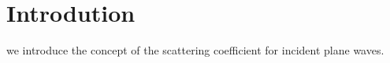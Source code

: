 \documentclass[12pt]{iopart}
\begin{document}
\newcommand{\mL}{\mathscr{L}}
\newcommand{\cT}{{\cal T}}
\newcommand{\cM}{{\cal M}}
\newcommand{\cE}{{\cal E}}
\newcommand{\cL}{{\cal L}}
\newcommand{\cF}{{\cal F}}
\newcommand{\cB}{{\cal B}}
\newcommand{\PML}{{\rm PML}}
\newcommand{\FEM}{{\rm FEM}}
\newcommand{\rd}{\,\mathrm{d}}

\renewcommand{\i}{\mathbf{i}}
\renewcommand{\v}{\mathbf{v}}
\renewcommand{\u}{\mathbf{u}}
\renewcommand{\r}{\mathbf{r}}
\newcommand{\gR}{{\mathbb{R}}}
\newcommand{\Z}{{\mathbb{Z}}}
\newcommand{\C}{{\mathbb{C}}}
\newcommand{\I}{{\mathbb{I}}}
\renewcommand{\Re}{\mathrm{Re}\,}
\renewcommand{\Im}{\mathrm{Im}\,}
\renewcommand{\div}{\mathrm{div}}
\newcommand{\curl}{\mathrm{curl}}
\newcommand{\Curl}{\mathbf{curl}}
\newcommand{\pv}{\mathrm{p.v.}}

\newcommand{\Np}{\mathbb{N}_p}
\newcommand{\Ns}{\mathbb{N}_s}
\newcommand{\Tp}{\mathbb{T}_p}
\newcommand{\Ts}{\mathbb{T}_s}
\newcommand{\Na}{\mathbb{N}_\alpha}
\newcommand{\Nb}{\mathbb{N}_\beta}
\newcommand{\Ta}{\mathbb{T}_\alpha}
\newcommand{\Tb}{\mathbb{T}_\beta}
\newcommand{\GG}{\mathcal{G}}

\newcommand{\N}{\mathbb{N}}
\newcommand{\D}{\mathbb{D}}
\newcommand{\T}{\mathbb{T}}
\newcommand{\A}{\mathbb{A}}
\newcommand{\B}{\mathbb{B}}
\newcommand{\G}{\mathbb{G}}
\newcommand{\F}{\mathbb{F}}
\newcommand{\R}{\mathbb{R}}
\newcommand{\W}{\mathbb{W}}
\newcommand{\V}{\mathbb{V}}
\newcommand{\U}{\mathbb{U}}
\newcommand{\J}{\mathbb{J}}
\newcommand{\Zg}{\mathbb{Z}}
\newcommand{\Gtheta}{\mathbb{\Theta}}
\newcommand{\Gphi}{\mathbb{\Phi}}

\newcommand{\be}{\begin{eqnarray}}
\newcommand{\ee}{\end{eqnarray}}
\newcommand{\ben}{\begin{eqnarray*}}
	\newcommand{\een}{\end{eqnarray*}}
\newcommand{\nn}{\nonumber}

\section{Introdution}

we introduce the concept of the scattering coefficient for incident plane waves.
\end{document}
